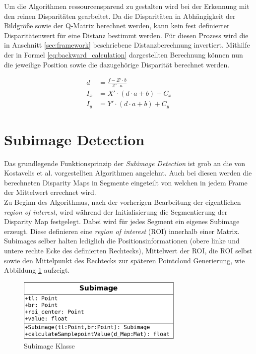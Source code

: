 \noindent
Um die Algorithmen ressourcensparend zu gestalten wird bei der Erkennung mit den reinen Disparitäten gearbeitet. Da die Disparitäten in Abhängigkeit der Bildgröße sowie der Q-Matrix berechnet werden, kann kein fest definierter Disparitätenwert für eine Distanz bestimmt werden. Für diesen Prozess wird die in Anschnitt \ref{sec:framework} beschriebene Distanzberechnung invertiert. Mithilfe der in Formel \ref{eq:backward_calculation} dargestellten Berechnung können nun die jeweilige Position sowie die dazugehörige Disparität berechnet werden. 

\begin{equation}
  \label{eq:backward_calculation}
  \begin{aligned}
    d &= \frac{f- Z' \cdot b}{Z' \cdot a}\\
    I_x &= X' \cdot (d \cdot a + b) + C_x\\
    I_y &= Y' \cdot (d \cdot a + b) + C_y
  \end{aligned}
\end{equation}


\section{Subimage Detection}
\label{sec:mean_disparity_detection}

Das grundlegende Funktionsprinzip der \emph{Subimage Detection} ist grob an die von Kostavelis et al. vorgestellten Algorithmen angelehnt. Auch bei diesen werden die berechneten Disparity Maps in Segmente eingeteilt von welchen in jedem Frame der Mittelwert errechnet wird.\\

\noindent
Zu Beginn des Algorithmus, nach der vorherigen Bearbeitung der eigentlichen \emph{region of interest}, wird während der Initialisierung die Segmentierung der Disparity Map festgelegt. Dabei wird für jedes Segment ein eigenes Subimage erzeugt. Diese definieren eine \emph{region of interest} (ROI) innerhalb einer Matrix. Subimages selber halten lediglich die Positionsinformationen (obere linke und untere rechte Ecke des definierten Rechtecks), Mittelwert der ROI, die ROI selbst sowie den Mittelpunkt des Rechtecks zur späteren Pointcloud Generierung, wie Abbildung \ref{fig:subimage_class} aufzeigt.

\begin{figure}[h]
	\begin{center}
		\includegraphics[width=8cm]{img/subimage_class.pdf}
	\end{center}
	\caption{Subimage Klasse}
	\label{fig:subimage_class}
\end{figure}

